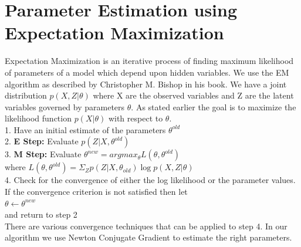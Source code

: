 \documentclass[12pt]{dalcsthesis}
\begin{document}
{\section{Parameter Estimation using Expectation Maximization}
Expectation Maximization is an iterative process of finding maximum likelihood of parameters of a model which depend upon hidden variables. We use the EM algorithm as described by Christopher M. Bishop in his book. We have a joint distribution $p(X,Z|\theta)$ where X are the observed variables and Z are the latent variables governed by parameters $\theta$. As stated earlier the goal is to maximize the likelihood function $p(X|\theta)$ with respect to $\theta$.
\\
1. Have an initial estimate of the parameters $\theta ^{old}$
\\
2. \textbf{E Step:} Evaluate $p(Z|X,\theta^{old})$
\\
3. \textbf{M Step:} Evaluate $\theta ^{new} = arg max _{\theta} L(\theta,\theta^{old})$
\\
\hspace*{20 mm} where 
$L(\theta,\theta^{old})=\Sigma _{Z} p(Z|X,\theta_{old}) \log p(X,Z|\theta)$
\\
4. Check for the convergence of either the log likelihood or the parameter values. If the convergence criterion is not satisfied then let
\\
\hspace*{20 mm} $\theta \leftarrow \theta^{new} $
\\
and return to step 2
\\
There are various convergence techniques that can be applied to step 4. In our algorithm we use Newton Conjugate Gradient to estimate the right parameters.	

}
\end{document}
